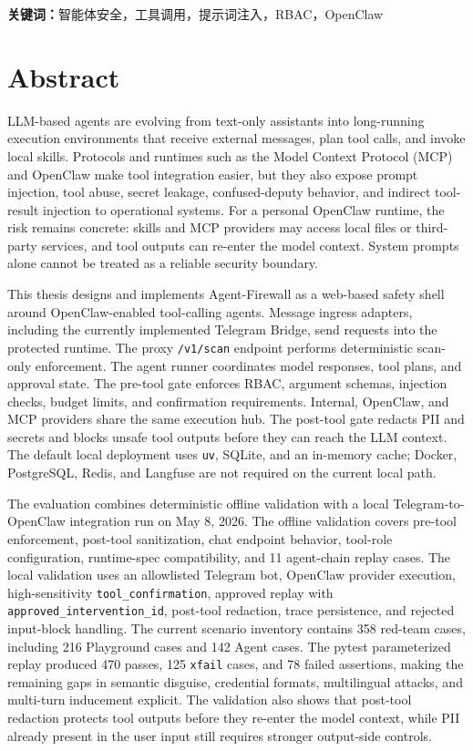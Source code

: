 \documentclass[UTF8,zihao=-4,scheme=chinese,fontset=none]{ctexart}
\newcommand{\code}[1]{{\ttfamily\small\nolinkurl{#1}}}
\newenvironment{enabstract}{\rmfamily}{\par}
\newcommand{\keywordspace}{\vspace{1\baselineskip}\noindent}
\begin{document}
\keywordspace\textbf{关键词：}智能体安全，工具调用，提示词注入，RBAC，OpenClaw

\clearpage
\section*{Abstract}

\begin{enabstract}
LLM-based agents are evolving from text-only assistants into long-running execution environments that receive external messages, plan tool calls, and invoke local skills. Protocols and runtimes such as the Model Context Protocol (MCP) and OpenClaw make tool integration easier, but they also expose prompt injection, tool abuse, secret leakage, confused-deputy behavior, and indirect tool-result injection to operational systems. For a personal OpenClaw runtime, the risk remains concrete: skills and MCP providers may access local files or third-party services, and tool outputs can re-enter the model context. System prompts alone cannot be treated as a reliable security boundary.

This thesis designs and implements Agent-Firewall as a web-based safety shell around OpenClaw-enabled tool-calling agents. Message ingress adapters, including the currently implemented Telegram Bridge, send requests into the protected runtime. The proxy \code{/v1/scan} endpoint performs deterministic scan-only enforcement. The agent runner coordinates model responses, tool plans, and approval state. The pre-tool gate enforces RBAC, argument schemas, injection checks, budget limits, and confirmation requirements. Internal, OpenClaw, and MCP providers share the same execution hub. The post-tool gate redacts PII and secrets and blocks unsafe tool outputs before they can reach the LLM context. The default local deployment uses \code{uv}, SQLite, and an in-memory cache; Docker, PostgreSQL, Redis, and Langfuse are not required on the current local path.

The evaluation combines deterministic offline validation with a local Telegram-to-OpenClaw integration run on May 8, 2026. The offline validation covers pre-tool enforcement, post-tool sanitization, chat endpoint behavior, tool-role configuration, runtime-spec compatibility, and 11 agent-chain replay cases. The local validation uses an allowlisted Telegram bot, OpenClaw provider execution, high-sensitivity \code{tool\_confirmation}, approved replay with \code{approved\_intervention\_id}, post-tool redaction, trace persistence, and rejected input-block handling. The current scenario inventory contains 358 red-team cases, including 216 Playground cases and 142 Agent cases. The pytest parameterized replay produced 470 passes, 125 \code{xfail} cases, and 78 failed assertions, making the remaining gaps in semantic disguise, credential formats, multilingual attacks, and multi-turn inducement explicit. The validation also shows that post-tool redaction protects tool outputs before they re-enter the model context, while PII already present in the user input still requires stronger output-side controls.


\end{enabstract}
\end{document}
